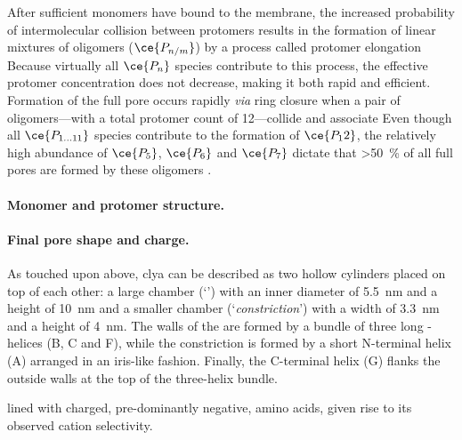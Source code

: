 After sufficient monomers have bound to the membrane, the increased probability of intermolecular collision
between protomers results in the formation of linear mixtures of oligomers ($\ce{P_{n/m}}$) by a process
called protomer elongation \cite{Roderer-2017}
%
%
Because virtually all $\ce{P_n}$ species contribute to this process, the effective protomer concentration does
not decrease, making it both rapid and efficient. Formation of the full pore occurs rapidly \textit{via} ring
closure when a pair of oligomers---with a total protomer count of 12---collide and associate
%
%
Even though all $\ce{P_{1\ldots11}}$ species contribute to the formation of $\ce{P_12}$, the relatively high
abundance of $\ce{P_5}$, $\ce{P_6}$ and $\ce{P_7}$ dictate that \SI{>50}{\percent} of all full pores are
formed by these oligomers \cite{Benke-2015}.


\paragraph{Monomer and protomer structure.}

\paragraph{Final pore shape and charge.}
As touched upon above, \gls{clya} can be described as two hollow cylinders placed on top of each other: a large \cisi{} chamber (`\lumen{}') with an inner diameter of \SI{5.5}{\nm} and a height of \SI{10}{\nm} and a smaller \transi{} chamber (`\textit{constriction}') with a width of \SI{3.3}{\nm} and a height of \SI{4}{\nm}. The walls of the \lumen{} are formed by a bundle of three long \textalpha-helices (\textalpha B, \textalpha C and \textalpha F), while the constriction is formed by a short N-terminal helix (\textalpha A) arranged in an iris-like fashion. Finally, the C-terminal helix (\textalpha G) flanks the outside walls at the top of the three-helix bundle.


lined with charged, pre-dominantly negative, amino acids, given rise to its observed cation selectivity. 







